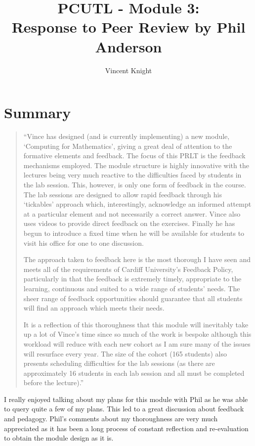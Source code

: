 \documentclass{article}
\title{PCUTL - Module 3:\\ Response to Peer Review by Phil Anderson}
\author{Vincent Knight}
\date{}
\begin{document}
\maketitle

\section{Summary}

\begin{quote}
``Vince has designed (and is currently implementing) a new module, `Computing for Mathematics', giving a great deal of attention to the formative elements and feedback.  The focus of this PRLT is the feedback mechanisms employed.  The module structure is highly innovative with the lectures being very much reactive to the difficulties faced by students in the lab session.  This, however, is only one form of feedback in the course.  The lab sessions are designed to allow rapid feedback through his `tickables' approach which, interestingly, acknowledge an informed attempt at a particular element and not necessarily a correct answer.  Vince also uses videos to provide direct feedback on the exercises.  Finally he has begun to introduce a fixed time when he will be available for students to visit his office for one to one discussion.

The approach taken to feedback here is the most thorough I have seen and meets all of the requirements of Cardiff University's Feedback Policy, particularly in that the feedback is extremely timely, appropriate to the learning, continuous and suited to a wide range of students' needs.  The sheer range of feedback opportunities should guarantee that all students will find an approach which meets their needs.

It is a reflection of this thoroughness that this module will inevitably take up a lot of Vince's time since so much of the work is bespoke although this workload will reduce with each new cohort as I am sure many of the issues will resurface every year.  The size of the cohort (165 students) also presents scheduling difficulties for the lab sessions (as there are approximately 16 students in each lab session and all must be completed before the lecture).''
\end{quote}

I really enjoyed talking about my plans for this module with Phil as he was able to query quite a few of my plans. This led to a great discussion about feedback and pedagogy. Phil's comments about my thoroughness are very much appreciated as it has been a long process of constant reflection and re-evaluation to obtain the module design as it is.
\end{document}
